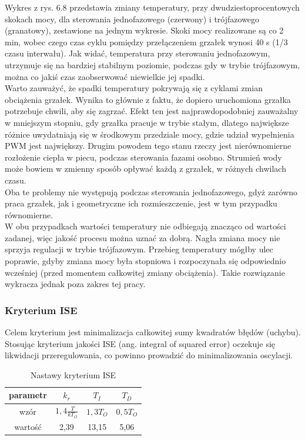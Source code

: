 \documentclass[a4paper,twoside,12pt]{book}
\begin{document}
\newpage
\noindent Wykres z rys. 6.8 przedstawia zmiany temperatury, przy dwudziestoprocentowych skokach mocy, dla sterowania jednofazowego (czerwony) i trójfazowego (granatowy), zestawione na jednym wykresie. Skoki mocy realizowane są co 2 min, wobec czego czas cyklu pomiędzy przełączeniem grzałek wynosi 40 s (1/3 czasu interwału). Jak widać, temperatura przy sterowaniu jednofazowym, utrzymuje się na bardziej stabilnym poziomie, podczas gdy w trybie trójfazowym, można co jakiś czas zaobserwować niewielkie jej spadki. \\

Warto zauważyć, że spadki temperatury pokrywają się z cyklami zmian obciążenia grzałek. Wynika to głównie z faktu, że dopiero uruchomiona grzałka potrzebuje chwili, aby się zagrzać. Efekt ten jest najprawdopodobniej zauważalny w mniejszym stopniu, gdy grzałka pracuje w trybie stałym, dlatego największe różnice uwydatniają się w środkowym przedziale mocy, gdzie udział wypełnienia PWM jest największy. Drugim powodem tego stanu rzeczy jest nierównomierne rozłożenie ciepła w piecu, podczas sterowania fazami osobno. Strumień wody może bowiem w zmienny sposób opływać każdą z grzałek, w różnych chwilach czasu.\\

Oba te problemy nie występują podczas sterowania jednofazowego, gdyż zarówno praca grzałek, jak i geometryczne ich rozmieszczenie, jest w tym przypadku równomierne.\\

W obu przypadkach wartości temperatury nie odbiegają znacząco od wartości zadanej, więc jakość procesu można uznać za dobrą. Nagła zmiana mocy nie sprzyja regulacji w trybie trójfazowym. Przebieg temperatury mógłby ulec poprawie, gdyby zmiana mocy była stopniowa i rozpoczynała się odpowiednio wcześniej (przed momentem całkowitej zmiany obciążenia). Takie rozwiązanie wykracza jednak poza zakres tej pracy.

\subsubsection{Kryterium ISE \cite{soni2013bf}}
Celem kryterium jest minimalizacja całkowitej sumy kwadratów błędów (uchybu). Stosując kryterium jakości ISE (ang. integral of squared error) oczekuje się likwidacji przeregulowania, co powinno prowadzić do minimalizowania oscylacji.

\begin{table}[h]
	\centering
	\caption{Nastawy kryterium ISE}
	\label{id:tab:ISE}
	\renewcommand\cellalign{lc}
	\setcellgapes{2.0ex}

	\makegapedcells %
	\begin{tabular}{|c|c|c|c|}
		\hline
		parametr & $k_r$                  & $T_I$    & $T_D$    \\
		\hline
		wzór     & $1,4 \frac{T}{{kT_O}}$ & $1,3T_O$ & $0,5T_O$
		\\
		\hline
		wartość  & 2,39                   & 13,15    & 5,06     \\
		\hline
	\end{tabular}
\end{table}
\end{document}
